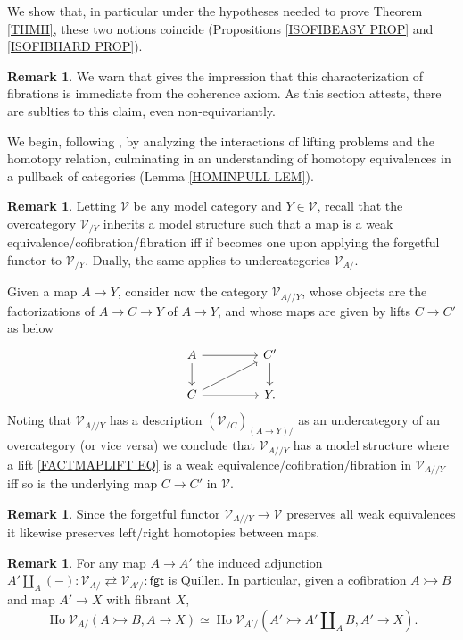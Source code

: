 \documentclass[a4paper,10pt
,draft
]{article}%
\numberwithin{equation}{section}
\numberwithin{figure}{section}
\theoremstyle{definition} %
\newtheorem{remark}[equation]{Remark}%
\DeclareMathOperator{\Ho}{Ho}
\newcommand{\V}{\ensuremath{\mathcal V}}
\newcommand{\1}{\ensuremath{\mathbbm 1}}%
\begin{document}
We show that, in particular under the hypotheses needed to prove Theorem \ref{THMII},
these two notions coincide (Propositions \ref{ISOFIBEASY PROP} and \ref{ISOFIBHARD PROP}).

\begin{remark}
      We warn that \cite[Remark 2.14]{BM13} gives the impression that this characterization of fibrations
      is immediate from the coherence axiom.
      As this section attests, there are sublties to this claim, even non-equivariantly.
\end{remark}

We begin, following \cite{Ber07b}, by analyzing the interactions of lifting problems and the homotopy relation,
culminating in an understanding of homotopy equivalences in a pullback of categories (Lemma \ref{HOMINPULL LEM}).


\begin{remark}\label{FACTMAPLIFT REM}
Letting $\V$ be any model category and $Y\in \V$,
recall that the overcategory $\V_{/Y}$ 
inherits a model structure
such that a map is a weak equivalence/cofibration/fibration 
iff if becomes one upon applying the forgetful functor to 
$\V_{/Y}$.
Dually, the same applies to undercategories $\V_{A/}$.

Given a map $A\to Y$, consider now the category
$\V_{A//Y}$, whose objects are the factorizations of $A\to C \to  Y$ of $A \to Y$, and whose maps are given by lifts
$C \to C'$ as below
\begin{equation}\label{FACTMAPLIFT EQ}
\begin{tikzcd}[column sep = 45pt]
	A \ar{r}
	\arrow{d}
&
	C' \arrow{d}
\\
	C\ar{r} \ar{ru}
&
	Y.
\end{tikzcd}
\end{equation}
Noting that $\V_{A//Y}$ has a description
$\left(\V_{/C}\right)_{(A\to Y)/}$
as an undercategory of an overcategory (or vice versa)
we conclude that $\V_{A//Y}$ has a model structure where a lift
\eqref{FACTMAPLIFT EQ}
is a weak equivalence/cofibration/fibration in $\V_{A//Y}$
iff so is the underlying map
$C\to C'$ in $\V$.
\end{remark}


\begin{remark}\label{UNDFGT REM}
Since the forgetful functor $\V_{A//Y} \to \V$
preserves all weak equivalences 
it likewise preserves left/right homotopies between maps.
\end{remark}


\begin{remark} \label{LEFTQUILUND REM}
For any map $A \to A'$ the induced adjunction
$A' \amalg_A (-) \colon \V_{A/} 
\rightleftarrows 
\V_{A'/} \colon \mathsf{fgt}$
is Quillen.
In particular,
given a cofibration 
$A \rightarrowtail B$
and map $A' \to X$ with fibrant $X$,
\[
\Ho \V_{A/}\left(A \rightarrowtail B, A \to X\right)
\simeq
\Ho \V_{A'/}\left(A' \rightarrowtail A' \amalg_A B, A' \to X\right).
\]
\end{remark}
\end{document}
